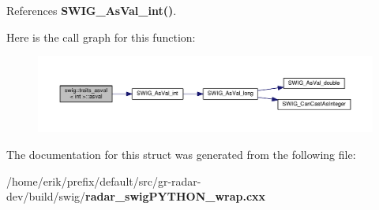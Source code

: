 References {\bf S\+W\+I\+G\+\_\+\+As\+Val\+\_\+int()}.



Here is the call graph for this function\+:
\nopagebreak
\begin{figure}[H]
\begin{center}
\leavevmode
\includegraphics[width=350pt]{df/db3/structswig_1_1traits__asval_3_01int_01_4_a5068cc0919535d5675bea4d703e8ec2b_cgraph}
\end{center}
\end{figure}




The documentation for this struct was generated from the following file\+:\begin{DoxyCompactItemize}
\item 
/home/erik/prefix/default/src/gr-\/radar-\/dev/build/swig/{\bf radar\+\_\+swig\+P\+Y\+T\+H\+O\+N\+\_\+wrap.\+cxx}\end{DoxyCompactItemize}
